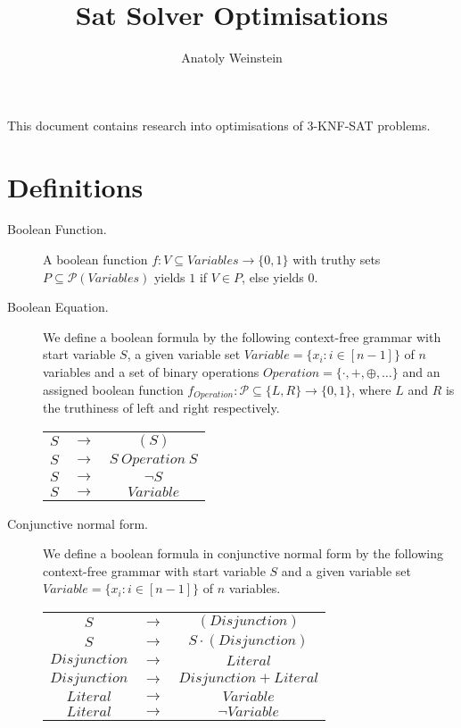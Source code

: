 \documentclass[12pt, letterpaper]{article}
\title{Sat Solver Optimisations}
\author{Anatoly Weinstein}
\begin{document}
\maketitle
This document contains research into optimisations of 3-KNF-SAT problems.

\section{Definitions}

\begin{description}
    \item[Boolean Function.] {
        A boolean function $f: V \subseteq Variables \rightarrow
        \{0, 1\}$ with truthy sets $P \subseteq \mathcal{P}(Variables)$
        yields $1$ if $V \in P$, else yields $0$.
    }
    \item[Boolean Equation.] {
        We define a boolean formula by the following context-free
        grammar with start variable $S$, a given variable set
        $Variable = \{x_i : i \in [n-1]\}$ of $n$ variables and a
        set of binary operations $Operation = \{\cdot, +, \oplus,
        \dots\}$ and an assigned boolean function $f_{Operation}
        : \mathcal{P} \subseteq \{L, R\} \rightarrow \{0, 1\}$,
        where $L$ and $R$ is the truthiness of left and right 
        respectively.

        \begin{tabular}{ccc}
            $S$ & $\rightarrow$& $(S)$ \\ 
            $S$ & $\rightarrow$& $S\ Operation\ S$ \\ 
            $S$ & $\rightarrow$& $\lnot S$ \\ 
            $S$ & $\rightarrow$& $Variable$ \\ 
           \end{tabular}
    }
    \item[Conjunctive normal form.] {
        We define a boolean formula in conjunctive normal form by
        the following context-free grammar with start variable $S$
        and a given variable set $Variable = \{x_i : i \in [n-1]\}$
        of $n$ variables.

        \begin{tabular}{ccc}
            $S$ & $\rightarrow$& $(Disjunction)$ \\ 
            $S$ & $\rightarrow$& $S \cdot (Disjunction)$ \\ 
            $Disjunction$ & $\rightarrow$& $Literal$ \\ 
            $Disjunction$ & $\rightarrow$& $Disjunction + Literal$ \\ 
            $Literal$ & $\rightarrow$& $Variable$ \\ 
            $Literal$ & $\rightarrow$& $\lnot Variable$ \\ 
           \end{tabular}
    }
\end{description}
\end{document}
